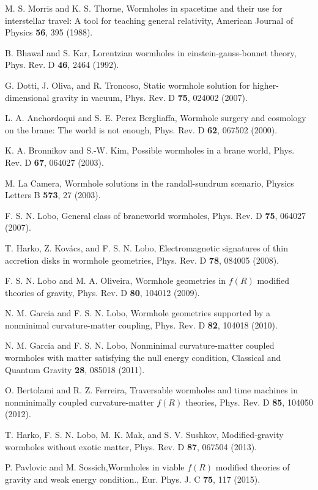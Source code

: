 \begin{thebibliography}{87}
 M. S. Morris and K. S. Thorne, Wormholes in spacetime and their use for interstellar travel: A tool for teaching general
relativity, American Journal of Physics \textbf{56}, 395 (1988).

B. Bhawal and S. Kar, Lorentzian wormholes in einstein-gauss-bonnet theory, Phys. Rev. D \textbf{46}, 2464 (1992).

G. Dotti, J. Oliva, and R. Troncoso, Static wormhole solution for higher-dimensional gravity in vacuum, Phys. Rev. D \textbf{75}, 024002 (2007).

 L. A. Anchordoqui and S. E. Perez Bergliaffa, Wormhole surgery and cosmology on the brane: The world is not enough,
Phys. Rev. D \textbf{62}, 067502 (2000).

 K. A. Bronnikov and S.-W. Kim, Possible wormholes in a brane world, Phys. Rev. D \textbf{67}, 064027 (2003).

 M. La Camera, Wormhole solutions in the randall-sundrum scenario, Physics Letters B \textbf{573}, 27 (2003).

 F. S. N. Lobo, General class of braneworld wormholes, Phys. Rev. D \textbf{75}, 064027 (2007).

 T. Harko, Z. Kov\'acs, and F. S. N. Lobo, Electromagnetic signatures of thin accretion disks in wormhole geometries, Phys.
Rev. D \textbf{78}, 084005 (2008).

 F. S. N. Lobo and M. A. Oliveira, Wormhole geometries in $f(R)$ modified theories of gravity, Phys. Rev. D \textbf{80}, 104012 (2009).

 N. M. Garcia and F. S. N. Lobo, Wormhole geometries supported by a nonminimal curvature-matter coupling, Phys. Rev. D
\textbf{82}, 104018 (2010).

N. M. Garcia and F. S. N. Lobo, Nonminimal curvature-matter coupled wormholes with matter satisfying the null energy
condition, Classical and Quantum Gravity \textbf{28}, 085018 (2011).

O. Bertolami and R. Z. Ferreira, Traversable wormholes and time machines in nonminimally coupled curvature-matter $f(R)$
theories, Phys. Rev. D \textbf{85}, 104050 (2012).

 T. Harko, F. S. N. Lobo, M. K. Mak, and S. V. Sushkov, Modified-gravity wormholes without exotic matter, Phys. Rev. D \textbf{87},
067504 (2013).

 P. Pavlovic and M. Sossich,Wormholes in viable $f(R)$ modified theories of gravity and weak energy condition., Eur. Phys. J. C
\textbf{75}, 117 (2015).


\end{thebibliography}

